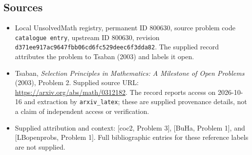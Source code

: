 \documentclass[11pt]{article}
\begin{document}
\subsection{Sources}
\begin{itemize}
\item Local UnsolvedMath registry, permanent ID \(800630\), source problem code \texttt{catalogue entry}, upstream ID \(800630\), revision \texttt{d371ee917ac9647fbb06cd6fc529deec6f3dda82}. The supplied record attributes the problem to Tsaban (2003) and labels it open.
\item Tsaban, \emph{Selection Principles in Mathematics: A Milestone of Open Problems} (2003), Problem 2. Supplied source URL: \url{https://arxiv.org/abs/math/0312182}. The record reports access on 2026-10-16 and extraction by \texttt{arxiv\_latex}; these are supplied provenance details, not a claim of independent access or verification.
\item Supplied attribution and context: [coc2, Problem 3], [BuHa, Problem 1], and [LBopenprobs, Problem 1]. Full bibliographic entries for these reference labels are not supplied.
\end{itemize}
\end{document}
